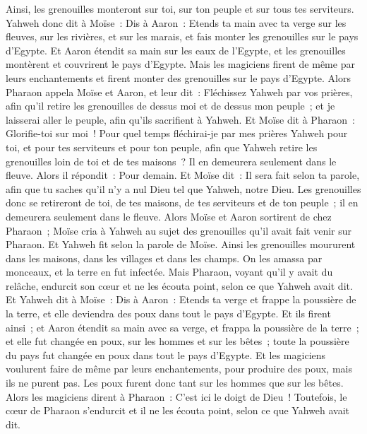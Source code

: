 \begin{multicols}{2}
Ainsi, les grenouilles monteront sur toi, sur ton peuple et sur tous tes serviteurs.
\VerseOne{}Yahweh donc dit à Moïse~: Dis à Aaron~: Etends ta main avec ta verge sur les fleuves, sur les rivières, et sur les marais, et fais monter les grenouilles sur le pays d'Egypte.
Et Aaron étendit sa main sur les eaux de l'Egypte, et les grenouilles montèrent et couvrirent le pays d'Egypte.
Mais les magiciens firent de même par leurs enchantements et firent monter des grenouilles sur le pays d'Egypte.
Alors Pharaon appela Moïse et Aaron, et leur dit~: Fléchissez Yahweh par vos prières, afin qu'il retire les grenouilles de dessus moi et de dessus mon peuple~; et je laisserai aller le peuple, afin qu'ils sacrifient à Yahweh.
Et Moïse dit à Pharaon~: Glorifie-toi sur moi~! Pour quel temps fléchirai-je par mes prières Yahweh pour toi, et pour tes serviteurs et pour ton peuple, afin que Yahweh retire les grenouilles loin de toi et de tes maisons~? Il en demeurera seulement dans le fleuve.
Alors il répondit~: Pour demain. Et Moïse dit~: Il sera fait selon ta parole, afin que tu saches qu'il n'y a nul Dieu tel que Yahweh, notre Dieu.
Les grenouilles donc se retireront de toi, de tes maisons, de tes serviteurs et de ton peuple~; il en demeurera seulement dans le fleuve.
Alors Moïse et Aaron sortirent de chez Pharaon~; Moïse cria à Yahweh au sujet des grenouilles qu'il avait fait venir sur Pharaon.
Et Yahweh fit selon la parole de Moïse. Ainsi les grenouilles moururent dans les maisons, dans les villages et dans les champs.
On les amassa par monceaux, et la terre en fut infectée.
Mais Pharaon, voyant qu'il y avait du relâche, endurcit son cœur et ne les écouta point, selon ce que Yahweh avait dit.
Et Yahweh dit à Moïse~: Dis à Aaron~: Etends ta verge et frappe la poussière de la terre, et elle deviendra des poux dans tout le pays d'Egypte.
Et ils firent ainsi~; et Aaron étendit sa main avec sa verge, et frappa la poussière de la terre~; et elle fut changée en poux, sur les hommes et sur les bêtes~; toute la poussière du pays fut changée en poux dans tout le pays d'Egypte.
Et les magiciens voulurent faire de même par leurs enchantements, pour produire des poux, mais ils ne purent pas. Les poux furent donc tant sur les hommes que sur les bêtes.
Alors les magiciens dirent à Pharaon~: C'est ici le doigt de Dieu~! Toutefois, le cœur de Pharaon s'endurcit et il ne les écouta point, selon ce que Yahweh avait dit.

\end{multicols}

